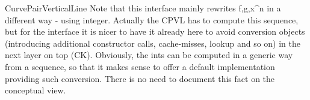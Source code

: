 \begin{ccRefConcept}{CurvePairVerticalLine}
Note that this interface mainly rewrites {f,g,x}^n in a different way - using
integer. Actually the CPVL has to compute this sequence, but for
the interface it is nicer to have it already here to avoid conversion objects
(introducing additional constructor calls, cache-misses, lookup and so on) in
the next layer on top (CK). Obviously, the ints can be computed in a generic
way from a sequence, so that it makes sense to offer a default implementation
providing such conversion. There is no need to document this fact on the 
conceptual view.


\end{ccRefConcept}


